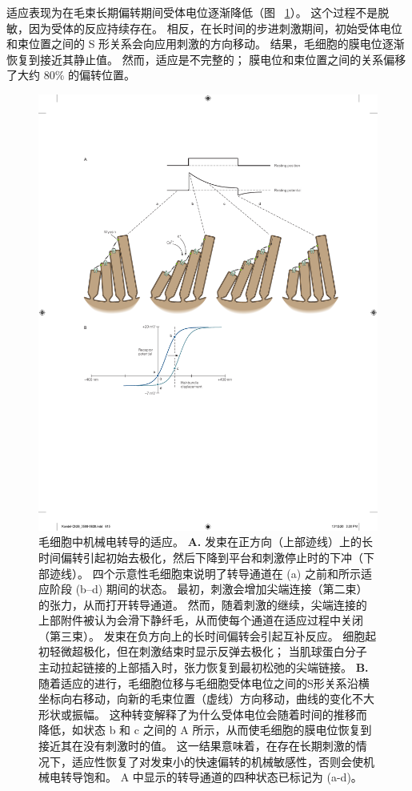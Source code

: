 适应表现为在毛束长期偏转期间受体电位逐渐降低（图 ~\ref{fig:26_12}）。
这个过程不是脱敏，因为受体的反应持续存在。
相反，在长时间的步进刺激期间，初始受体电位和束位置之间的 S 形关系会向应用刺激的方向移动。
结果，毛细胞的膜电位逐渐恢复到接近其静止值。
然而，适应是不完整的；
膜电位和束位置之间的关系偏移了大约 80\% 的偏转位置。


\begin{figure}[htbp]
	\centering
	\includegraphics[width=0.95\linewidth]{chap26/fig_26_12}
	\caption{毛细胞中机械电转导的适应。
		\textbf{A.} 发束在正方向（上部迹线）上的长时间偏转引起初始去极化，然后下降到平台和刺激停止时的下冲（下部迹线）。
		四个示意性毛细胞束说明了转导通道在 (a) 之前和所示适应阶段 (b–d) 期间的状态。
		最初，刺激会增加尖端连接（第二束）的张力，从而打开转导通道。 然而，随着刺激的继续，尖端连接的上部附件被认为会滑下静纤毛，从而使每个通道在适应过程中关闭（第三束）。
		发束在负方向上的长时间偏转会引起互补反应。
		细胞起初轻微超极化，但在刺激结束时显示反弹去极化；
		当肌球蛋白分子主动拉起链接的上部插入时，张力恢复到最初松弛的尖端链接。
		\textbf{B.} 随着适应的进行，毛细胞位移与毛细胞受体电位之间的S形关系沿横坐标向右移动，向新的毛束位置（虚线）方向移动，曲线的变化不大 形状或振幅。
		这种转变解释了为什么受体电位会随着时间的推移而降低，如状态 b 和 c 之间的 A 所示，从而使毛细胞的膜电位恢复到接近其在没有刺激时的值。
		这一结果意味着，在存在长期刺激的情况下，适应性恢复了对发束小的快速偏转的机械敏感性，否则会使机械电转导饱和。
		A 中显示的转导通道的四种状态已标记为 (a-d)\cite{hudspeth1994pulling}。}
	\label{fig:26_12}
\end{figure}


